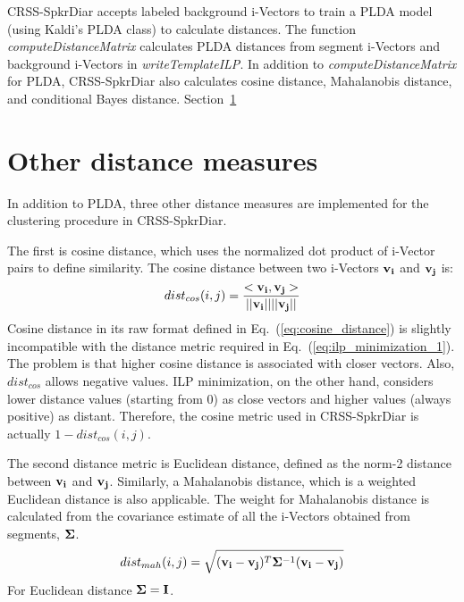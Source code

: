 CRSS-SpkrDiar accepts labeled background i-Vectors to train a PLDA model (using Kaldi's PLDA class) to calculate distances. 
The function {\it computeDistanceMatrix}  calculates PLDA distances from segment i-Vectors and background i-Vectors in {\it writeTemplateILP}. 
In addition to {\it computeDistanceMatrix} for PLDA, CRSS-SpkrDiar also calculates cosine distance, Mahalanobis distance, and conditional Bayes distance. 
Section~\ref{sec:other_distances_ilp}

\section{Other distance measures}
\label{sec:other_distances_ilp}
In addition to PLDA, three other distance measures are implemented for the clustering procedure in CRSS-SpkrDiar. 

The first is cosine distance, which uses the normalized dot product of i-Vector pairs to define similarity. The cosine distance between two i-Vectors ${\bf v_i}$ and ${\bf v_j}$ is: 
\begin{equation}
\label{eq:cosine_distance}
dist_{cos}(i,j) = \frac{<{\bf v_i} , {\bf v_j} >}{|| {\bf v_i} ||||{\bf v_j}|| }
\end{equation}
Cosine distance in its raw format defined in Eq.~(\ref{eq:cosine_distance}) is slightly incompatible with the distance metric required in Eq.~(\ref{eq:ilp_minimization_1}). 
The problem is that higher cosine distance is associated with closer vectors. Also, $dist_{cos}$ allows negative values. 
ILP minimization, on the other hand, considers lower distance values (starting from $0$) as close vectors and higher values (always positive) as distant. 
Therefore, the cosine metric used in CRSS-SpkrDiar is actually $1 - dist_{cos}(i,j)$. 

The second distance metric is Euclidean distance, defined as the norm-2 distance between ${\bf v_i}$ and ${\bf v_j}$. Similarly, a Mahalanobis distance, which is a weighted Euclidean distance is also applicable. The weight for Mahalanobis distance is calculated from the covariance estimate of all the i-Vectors obtained from segments, ${\bf \Sigma}$. 
\begin{equation}
dist_{mah}(i,j) = \sqrt{({\bf v_i} - {\bf v_j})^T{\bf \Sigma}^{-1}({\bf v_i} - {\bf v_j})}
\end{equation}
For Euclidean distance ${\bf \Sigma} = {\bf I}$. 

